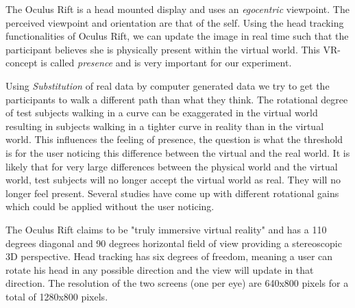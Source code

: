 The Oculus Rift is a head mounted display and uses an \textit{egocentric} viewpoint. 
The perceived viewpoint and orientation are that of the self.
Using the head tracking functionalities of Oculus Rift, we can update the image in real time such that the participant believes she is physically present within the virtual world.
This VR-concept is called \textit{presence} and is very important for our experiment.

Using \textit{Substitution} of real data by computer generated data we try to get the participants to walk a different path than what they think. 
The rotational degree of test subjects walking in a curve can be exaggerated in the virtual world resulting in subjects walking in a tighter curve in reality than in the virtual world.
This influences the feeling of presence, the question is what the threshold is for the user noticing this difference between the virtual and the real world. 
It is likely that for very large differences between the physical world and the virtual world, test subjects will no longer accept the virtual world as real.
They will no longer feel present. 
Several studies \cite{steinicke1} \cite{steinicke2} have come up with different rotational gains which could be applied without the user noticing.

The Oculus Rift claims to be "truly immersive virtual reality" and has a 110 degrees diagonal and 90 degrees horizontal field of view providing a stereoscopic 3D perspective.
Head tracking has six degrees of freedom, meaning a user can rotate his head in any possible direction and the view will update in that direction.
The resolution of the two screens (one per eye) are 640x800 pixels for a total of 1280x800 pixels.
